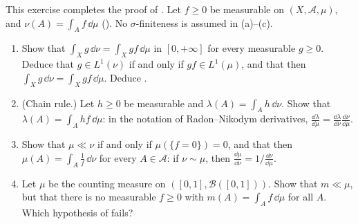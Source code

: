 \begin{exercise}\label{ex:ld-density-integral}
\medium This exercise completes the proof of . Let $f\ge0$ be
measurable on $(X,\mathcal A,\mu)$, and $\nu(A)=\int_Af\,\dd\mu$ (). No
$\sigma$-finiteness is assumed in (a)--(c).
\begin{enumerate}[label=(\alph*)]
  \item Show that $\int_Xg\,\dd\nu=\int_Xgf\,\dd\mu$ in $[0,+\infty]$ for every measurable $g\ge0$.
    Deduce that $g\in L^1(\nu)$ if and only if $gf\in L^1(\mu)$, and that then
    $\int_Xg\,\dd\nu=\int_Xgf\,\dd\mu$. Deduce .
  \item (Chain rule.) Let $h\ge0$ be measurable and $\lambda(A)=\int_Ah\,\dd\nu$. Show that
    $\lambda(A)=\int_Ahf\,\dd\mu$: in the notation of Radon--Nikodym derivatives,
    $\frac{\dd\lambda}{\dd\mu}=\frac{\dd\lambda}{\dd\nu}\frac{\dd\nu}{\dd\mu}$.
  \item Show that $\mu\ll\nu$ if and only if $\mu(\{f=0\})=0$, and that then $\mu(A)=\int_A\frac1f\,\dd\nu$
    for every $A\in\mathcal A$: if $\nu\sim\mu$, then $\frac{\dd\mu}{\dd\nu}=1/\frac{\dd\nu}{\dd\mu}$.
  \item Let $\mu$ be the counting measure on $([0,1],\mathcal B([0,1]))$. Show that $m\ll\mu$, but that
    there is no measurable $f\ge0$ with $m(A)=\int_Af\,\dd\mu$ for all $A$. Which hypothesis of
     fails?
\end{enumerate}
\end{exercise}

